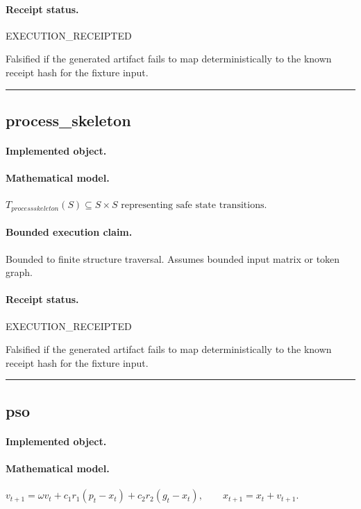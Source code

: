 \paragraph{Receipt status.} EXECUTION\_RECEIPTED
\begin{falsifier}
Falsified if the generated artifact fails to map deterministically to the known receipt hash for the fixture input.
\end{falsifier}

\vspace{1em}\hrule\vspace{1em}
\subsection{process\_skeleton}
\paragraph{Implemented object.} 
\paragraph{Mathematical model.} $T_{processskeleton}(S) \subseteq S \times S \text{ representing safe state transitions}.$
\paragraph{Bounded execution claim.} Bounded to finite structure traversal. Assumes bounded input matrix or token graph.
\paragraph{Receipt status.} EXECUTION\_RECEIPTED
\begin{falsifier}
Falsified if the generated artifact fails to map deterministically to the known receipt hash for the fixture input.
\end{falsifier}

\vspace{1em}\hrule\vspace{1em}
\subsection{pso}
\paragraph{Implemented object.} 
\paragraph{Mathematical model.} $v_{t+1} = \omega v_t+c_1r_1(p_t-x_t)+c_2r_2(g_t-x_t), \qquad x_{t+1}=x_t+v_{t+1}.$
